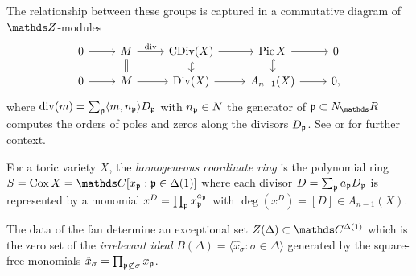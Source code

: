 \documentclass{paper}
\begin{document}
The relationship between these groups is captured in a commutative diagram of $\ZZ$-modules
\begin{equation}\label{eq:toric-div}
\begin{tikzcd}[row sep=small]
	0 & M & {\CDiv X} & {\Pic X} & 0 \\
	0 & M & {\Div X} & {A_{n-1}(X)} & 0,
	\arrow[from=1-1, to=1-2]
	\arrow["\mathrm{div}", from=1-2, to=1-3]
	\arrow[from=1-3, to=1-4]
	\arrow[from=1-4, to=1-5]
	\arrow[from=2-1, to=2-2]
	\arrow[from=2-2, to=2-3]
	\arrow[from=2-3, to=2-4]
	\arrow[from=2-4, to=2-5]
	\arrow[Rightarrow, no head, from=1-2, to=2-2]
	\arrow[hook, from=1-3, to=2-3]
	\arrow[hook, from=1-4, to=2-4]
\end{tikzcd}
\end{equation}
where \( \mathrm{div}(m) = \sum_{\mathfrak{p}} \langle m, n_{\mathfrak{p}} \rangle D_{\mathfrak{p}} \) with $n_{\mathfrak{p}} \in N$ the generator of
$\p\subset N_\RR$ computes the orders of poles and zeros along the divisors $D_{\mathfrak{p}}$.
See \cite{Cox95} or \cite[Ch.II \S6]{Hartshorne1977} for further context.

\begin{definition} For a toric variety $X$, the \emph{homogeneous coordinate ring} is the polynomial ring
  \( S = \Cox X = \CC[x_\p : \p\in\Delta(1)] \) where each divisor $ D = \sum_{\mathfrak{p}} a_{\mathfrak{p}} D_{\mathfrak{p}} $ is represented by
  a monomial $ x^D = \prod_{\mathfrak{p}} x_{\mathfrak{p}}^{a_{\mathfrak{p}}} $ with $ \deg(x^D) = [D] \in A_{n-1}(X) $.

  The data of the fan determine an exceptional set $Z(\Delta) \subset \CC^{\Delta(1)}$ which is the zero set of
  the \emph{irrelevant ideal} \( B(\Delta) = \langle \hat x_\sigma : \sigma\in\Delta \rangle \)
  generated by the square-free monomials $\hat x_\sigma = \prod_{\mathfrak{p}\not\subset\sigma} x_{\mathfrak{p}}$.
  \end{definition}
\fi
\end{document}
